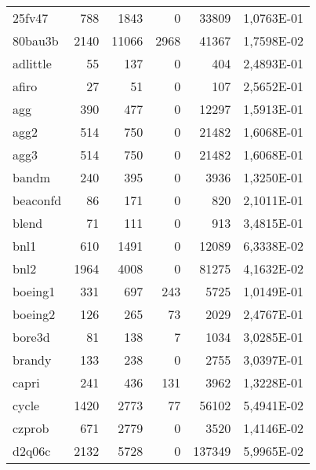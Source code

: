 {\begin{longtable}{>{\ttfamily}lrrrrc}
\midrule  
\multicolumn{6}{r}{\scriptsize Continua na próxima página.}
\endfoot
25fv47       		& 788       & 1843      & 0           & 33809    & \num{1,0763E-01} \\
80bau3b      		& 2140      & 11066     & 2968        & 41367    & \num{1,7598E-02} \\
adlittle     		& 55        & 137       & 0           & 404      & \num{2,4893E-01} \\
afiro        		& 27        & 51        & 0           & 107      & \num{2,5652E-01} \\
agg          		& 390       & 477       & 0           & 12297    & \num{1,5913E-01} \\
agg2         		& 514       & 750       & 0           & 21482    & \num{1,6068E-01} \\
agg3         		& 514       & 750       & 0           & 21482    & \num{1,6068E-01} \\
bandm        		& 240       & 395       & 0           & 3936     & \num{1,3250E-01} \\
beaconfd     		& 86        & 171       & 0           & 820      & \num{2,1011E-01} \\
blend        		& 71        & 111       & 0           & 913      & \num{3,4815E-01} \\
bnl1         		& 610       & 1491      & 0           & 12089    & \num{6,3338E-02} \\
bnl2         		& 1964      & 4008      & 0           & 81275    & \num{4,1632E-02} \\
boeing1      		& 331       & 697       & 243         & 5725     & \num{1,0149E-01} \\
boeing2      		& 126       & 265       & 73          & 2029     & \num{2,4767E-01} \\
bore3d       		& 81        & 138       & 7           & 1034     & \num{3,0285E-01} \\
brandy       		& 133       & 238       & 0           & 2755     & \num{3,0397E-01} \\
capri        		& 241       & 436       & 131         & 3962     & \num{1,3228E-01} \\
cycle        		& 1420      & 2773      & 77          & 56102    & \num{5,4941E-02} \\
czprob       		& 671       & 2779      & 0           & 3520     & \num{1,4146E-02} \\
d2q06c       		& 2132      & 5728      & 0           & 137349   & \num{5,9965E-02} \\

\end{longtable}}
